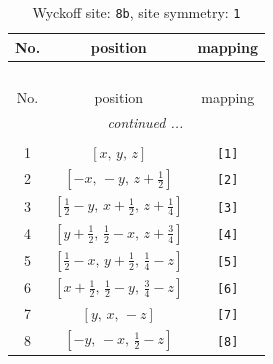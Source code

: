 \documentclass[fleqn,8pt]{jsarticle}
\begin{document}
\begin{longtable}{ccc}
\caption{Wyckoff site: {\tt 8b}, site symmetry: {\tt 1}}
 \\
 \hline \hline
No. & position & mapping \\ \hline \endfirsthead

\multicolumn{2}{l}{\tablename\ \thetable{}} \\
 \hline \hline
No. & position & mapping \\ \hline \endhead

 \hline \hline
\multicolumn{2}{r}{\footnotesize\it continued ...} \\ \endfoot

 \hline \hline
\multicolumn{2}{r}{} \\ \endlastfoot

1 & $\left[ x,\, y,\, z \right]$ & {\tt [1]} \\ \hline
2 & $\left[ - x,\, - y,\, z + \frac{1}{2} \right]$ & {\tt [2]} \\ \hline
3 & $\left[ \frac{1}{2} - y,\, x + \frac{1}{2},\, z + \frac{1}{4} \right]$ & {\tt [3]} \\ \hline
4 & $\left[ y + \frac{1}{2},\, \frac{1}{2} - x,\, z + \frac{3}{4} \right]$ & {\tt [4]} \\ \hline
5 & $\left[ \frac{1}{2} - x,\, y + \frac{1}{2},\, \frac{1}{4} - z \right]$ & {\tt [5]} \\ \hline
6 & $\left[ x + \frac{1}{2},\, \frac{1}{2} - y,\, \frac{3}{4} - z \right]$ & {\tt [6]} \\ \hline
7 & $\left[ y,\, x,\, - z \right]$ & {\tt [7]} \\ \hline
8 & $\left[ - y,\, - x,\, \frac{1}{2} - z \right]$ & {\tt [8]} \\
\end{longtable}
\end{document}
